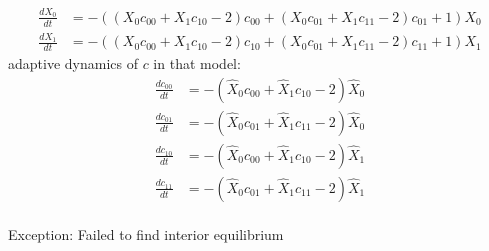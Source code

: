 \documentclass{article}
\begin{document}
\[\begin{align*}
\frac{dX_{0}}{dt} &= -{\left({\left(X_{0} c_{00} + X_{1} c_{10} - 2\right)} c_{00} + {\left(X_{0} c_{01} + X_{1} c_{11} - 2\right)} c_{01} + 1\right)} X_{0}\\
\frac{dX_{1}}{dt} &= -{\left({\left(X_{0} c_{00} + X_{1} c_{10} - 2\right)} c_{10} + {\left(X_{0} c_{01} + X_{1} c_{11} - 2\right)} c_{11} + 1\right)} X_{1}
\end{align*}\]
adaptive dynamics of $c$ in that model:
\[\begin{align*}
\frac{dc_{00}}{dt} &= -{\left(\hat{X}_{0} c_{00} + \hat{X}_{1} c_{10} - 2\right)} \hat{X}_{0}\\
\frac{dc_{01}}{dt} &= -{\left(\hat{X}_{0} c_{01} + \hat{X}_{1} c_{11} - 2\right)} \hat{X}_{0}\\
\frac{dc_{10}}{dt} &= -{\left(\hat{X}_{0} c_{00} + \hat{X}_{1} c_{10} - 2\right)} \hat{X}_{1}\\
\frac{dc_{11}}{dt} &= -{\left(\hat{X}_{0} c_{01} + \hat{X}_{1} c_{11} - 2\right)} \hat{X}_{1}
\end{align*}\]
\\Exception: Failed to find interior equilibrium\\
\end{document}
